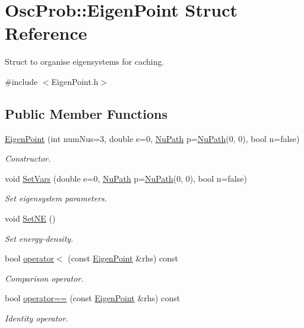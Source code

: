 \hypertarget{structOscProb_1_1EigenPoint}{}\section{Osc\+Prob\+:\+:Eigen\+Point Struct Reference}
\label{structOscProb_1_1EigenPoint}


Struct to organise eigensystems for caching.  




{\ttfamily \#include $<$Eigen\+Point.\+h$>$}

\subsection*{Public Member Functions}
\begin{DoxyCompactItemize}
\item 
\hyperlink{structOscProb_1_1EigenPoint_ac794ea130acf5d9b09123f8ac28425a2}{Eigen\+Point} (int num\+Nus=3, double e=0, \hyperlink{structOscProb_1_1NuPath}{Nu\+Path} p=\hyperlink{structOscProb_1_1NuPath}{Nu\+Path}(0, 0), bool n=false)
\begin{DoxyCompactList}\small\item\em Constructor. \end{DoxyCompactList}\item 
void \hyperlink{structOscProb_1_1EigenPoint_a2e293e0820715950ec8fb370e8cc9477}{Set\+Vars} (double e=0, \hyperlink{structOscProb_1_1NuPath}{Nu\+Path} p=\hyperlink{structOscProb_1_1NuPath}{Nu\+Path}(0, 0), bool n=false)
\begin{DoxyCompactList}\small\item\em Set eigensystem parameters. \end{DoxyCompactList}\item 
void \hyperlink{structOscProb_1_1EigenPoint_a30abf0fdf72716458bcf530bd3b806b0}{Set\+NE} ()
\begin{DoxyCompactList}\small\item\em Set energy-\/density. \end{DoxyCompactList}\item 
bool \hyperlink{structOscProb_1_1EigenPoint_ac171b4676fdae01c74eb3ed1fcd9efca}{operator$<$} (const \hyperlink{structOscProb_1_1EigenPoint}{Eigen\+Point} \&rhs) const
\begin{DoxyCompactList}\small\item\em Comparison operator. \end{DoxyCompactList}\item 
bool \hyperlink{structOscProb_1_1EigenPoint_a5f71d78d02e8169307d069e7516c94e9}{operator==} (const \hyperlink{structOscProb_1_1EigenPoint}{Eigen\+Point} \&rhs) const
\begin{DoxyCompactList}\small\item\em Identity operator. \end{DoxyCompactList}\end{DoxyCompactItemize}
